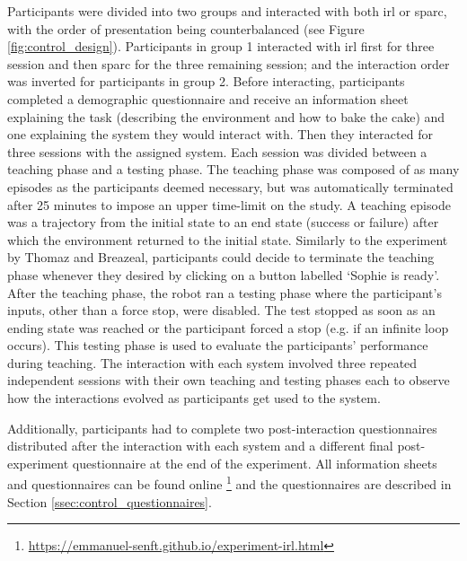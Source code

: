 Participants were divided into two groups and interacted with both \gls{irl} or \gls{sparc}, with the order of presentation being counterbalanced (see Figure \ref{fig:control_design}). Participants in group 1 interacted with \gls{irl} first for three session and then \gls{sparc} for the three remaining session; and the interaction order was inverted for participants in group 2. Before interacting, participants completed a demographic questionnaire and receive an information sheet explaining the task (describing the environment and how to bake the cake) and one explaining the system they would interact with. Then they interacted for three sessions with the assigned system. Each session was divided between a teaching phase and a testing phase. The teaching phase was composed of as many episodes as the participants deemed necessary, but was automatically terminated after 25 minutes to impose an upper time-limit on the study. A teaching episode was a trajectory from the initial state to an end state (success or failure) after which the environment returned to the initial state. Similarly to the experiment by Thomaz and Breazeal, participants could decide to terminate the teaching phase whenever they desired by clicking on a button labelled `Sophie is ready'. After the teaching phase, the robot ran a testing phase where the participant's inputs, other than a force stop, were disabled. The test stopped as soon as an ending state was reached or the participant forced a stop (e.g. if an infinite loop occurs). This testing phase is used to evaluate the participants' performance during teaching. The interaction with each system involved three repeated independent sessions with their own teaching and testing phases each to observe how the interactions evolved as participants get used to the system.

Additionally, participants had to complete two post-interaction questionnaires distributed after the interaction with each system and a different final post-experiment questionnaire at the end of the experiment. All information sheets and questionnaires can be found online \footnote{\url{https://emmanuel-senft.github.io/experiment-irl.html}} and the questionnaires are described in Section \ref{ssec:control_questionnaires}.

